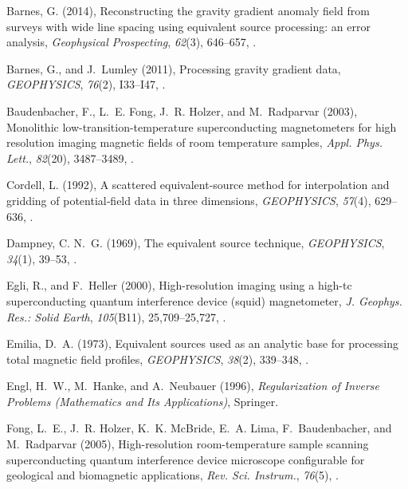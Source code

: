 \documentclass[draft,gc]{agutex}
\begin{document}
\begin{article}
\begin{thebibliography}{39}
Barnes, G. (2014), Reconstructing the gravity gradient anomaly field from
  surveys with wide line spacing using equivalent source processing: an error
  analysis, \textit{Geophysical Prospecting}, \textit{62}(3), 646--657,
  .

Barnes, G., and J.~Lumley (2011), Processing gravity gradient data,
  \textit{GEOPHYSICS}, \textit{76}(2), I33--I47, .

Baudenbacher, F., L.~E. Fong, J.~R. Holzer, and M.~Radparvar (2003), Monolithic
  low-transition-temperature superconducting magnetometers for high resolution
  imaging magnetic fields of room temperature samples, \textit{Appl. Phys.
  Lett.}, \textit{82}(20), 3487--3489,
  .

Cordell, L. (1992), A scattered equivalent-source method for interpolation and
  gridding of potential‐field data in three dimensions, \textit{GEOPHYSICS},
  \textit{57}(4), 629--636, .

Dampney, C. N.~G. (1969), The equivalent source technique, \textit{GEOPHYSICS},
  \textit{34}(1), 39--53, .

Egli, R., and F.~Heller (2000), High-resolution imaging using a high-tc
  superconducting quantum interference device (squid) magnetometer, \textit{J.
  Geophys. Res.: Solid Earth}, \textit{105}(B11), 25,709--25,727,
  .

Emilia, D.~A. (1973), Equivalent sources used as an analytic base for
  processing total magnetic field profiles, \textit{GEOPHYSICS},
  \textit{38}(2), 339--348, .

Engl, H.~W., M.~Hanke, and A.~Neubauer (1996), \textit{Regularization of
  Inverse Problems (Mathematics and Its Applications)}, Springer.

Fong, L.~E., J.~R. Holzer, K.~K. McBride, E.~A. Lima, F.~Baudenbacher, and
  M.~Radparvar (2005), High-resolution room-temperature sample scanning
  superconducting quantum interference device microscope configurable for
  geological and biomagnetic applications, \textit{Rev. Sci. Instrum.},
  \textit{76}(5), .


\end{thebibliography}
\end{article}
\end{document}
